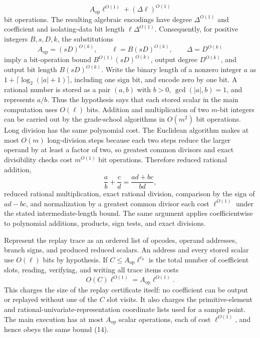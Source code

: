 \[
A_{\mathrm{op}}\ell^{O(1)}+(\Delta\ell)^{O(1)}
\]
bit operations.  The resulting algebraic encodings have degree \(\Delta^{O(1)}\) and coefficient and isolating-data bit length \(\ell\Delta^{O(1)}\).  Consequently, for positive integers \(B,s,D,k\), the substitutions
\[
A_{\mathrm{op}}=(sD)^{O(k)},\qquad
\ell=B(sD)^{O(k)},\qquad
\Delta=D^{O(k)}
\]
imply a bit-operation bound \(B^{O(1)}(sD)^{O(k)}\), output degree \(D^{O(k)}\), and output bit length \(B(sD)^{O(k)}\).
Write the binary length of a nonzero integer \(a\) as \(1+\lceil\log_2(|a|+1)\rceil\), including one sign bit, and encode zero by one bit.  A rational number is stored as a pair \((a,b)\) with \(b>0\), \(\gcd(|a|,b)=1\), and represents \(a/b\).  Thus the hypothesis says that each stored scalar in the main computation uses \(O(\ell)\) bits.  Addition and multiplication of two \(m\)-bit integers can be carried out by the grade-school algorithms in \(O(m^2)\) bit operations.  Long division has the same polynomial cost.  The Euclidean algorithm makes at most \(O(m)\) long-division steps because each two steps reduce the larger operand by at least a factor of two, so greatest common divisors and exact divisibility checks cost \(m^{O(1)}\) bit operations.  Therefore reduced rational addition,
\[
\frac ab+\frac cd=\frac{ad+bc}{bd},
\]
reduced rational multiplication, exact rational division, comparison by the sign of \(ad-bc\), and normalization by a greatest common divisor each cost \(\ell^{O(1)}\) under the stated intermediate-length bound.  The same argument applies coefficientwise to polynomial additions, products, sign tests, and exact divisions.

Represent the replay trace as an ordered list of opcodes, operand addresses, branch signs, and produced reduced scalars.  An address and every stored scalar use \(O(\ell)\) bits by hypothesis.  If \(C\le A_{\mathrm{op}}\ell^{c_0}\) is the total number of coefficient slots, reading, verifying, and writing all trace items costs
\[
O(C)\ell^{O(1)}=A_{\mathrm{op}}\ell^{O(1)}.
\tag{14}
\]
This charges the size of the replay certificate itself: no coefficient can be output or replayed without one of the \(C\) slot visits.  It also charges the primitive-element and rational-univariate-representation coordinate lists used for a sample point.  The main execution has at most \(A_{\mathrm{op}}\) scalar operations, each of cost \(\ell^{O(1)}\), and hence obeys the same bound (14).


